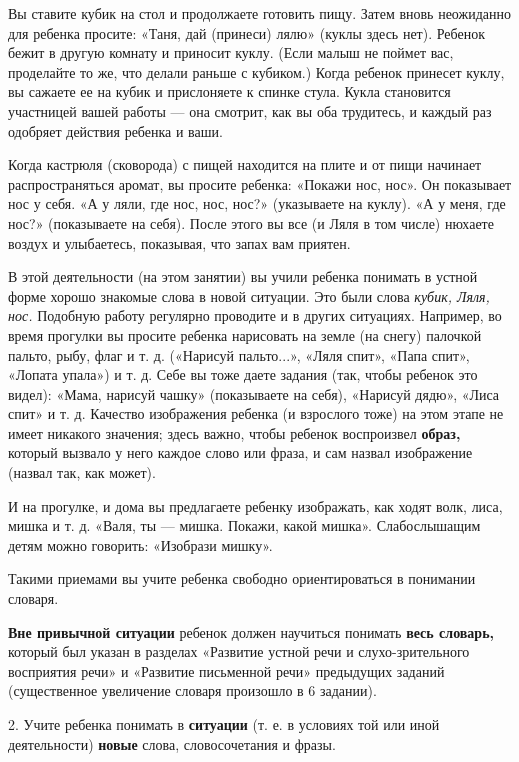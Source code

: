 \documentclass[a5paper]{book}
\renewcommand{\emph}[1]{\textit{#1}}
\begin{document}
Вы ставите кубик на стол и продолжаете готовить пищу. Затем вновь
неожиданно для ребенка просите: «Таня, дай (принеси) лялю» (куклы здесь
нет). Ребенок бежит в другую комнату и приносит куклу. (Если малыш не
поймет вас, проделайте то же, что делали раньше с кубиком.) Когда
ребенок принесет куклу, вы сажаете ее на кубик и прислоняете к спинке
стула. Кукла становится участницей вашей работы --- она смотрит, как вы
оба трудитесь, и каждый раз одобряет действия ребенка и ваши.

Когда кастрюля (сковорода) с пищей находится на плите и от пищи начинает
распространяться аромат, вы просите ребенка: «Покажи нос, нос». Он
показывает нос у себя. «А у ляли, где нос, нос, нос?» (указываете на
куклу). «А у меня, где нос?» (показываете на себя). После этого вы все
(и Ляля в том числе) нюхаете воздух и улыбаетесь, показывая, что запах
вам приятен.

В этой деятельности (на этом занятии) вы учили ребенка понимать в устной
форме хорошо знакомые слова в новой ситуации. Это были слова
\emph{кубик, Ляля, нос.} Подобную работу регулярно проводите и в других
ситуациях. Например, во время прогулки вы просите ребенка нарисовать на
земле (на снегу) палочкой пальто, рыбу, флаг и т. д. («Нарисуй
пальто...», «Ляля спит», «Папа спит», «Лопата упала») и т. д. Себе вы
тоже даете задания (так, чтобы ребенок это видел): «Мама, нарисуй чашку»
(показываете на себя), «Нарисуй дядю», «Лиса спит» и т. д. Качество
изображения ребенка (и взрослого тоже) на этом этапе не имеет никакого
значения; здесь важно, чтобы ребенок воспроизвел \textbf{образ,} который
вызвало у него каждое слово или фраза, и сам назвал изображение (назвал
так, как может).

И на прогулке, и дома вы предлагаете ребенку изображать, как ходят волк,
лиса, мишка и т. д. «Валя, ты --- мишка. Покажи, какой мишка».
Слабослышащим детям можно говорить: «Изобрази мишку».

Такими приемами вы учите ребенка свободно ориентироваться в понимании
словаря.

\textbf{Вне привычной ситуации} ребенок должен научиться понимать
\textbf{весь словарь,} который был указан в разделах «Развитие устной
речи и слухо-зрительного восприятия речи» и «Развитие письменной речи»
предыдущих заданий (существенное увеличение словаря произошло в 6
задании).

2. Учите ребенка понимать в \textbf{ситуации} (т. е. в условиях той или
иной деятельности) \textbf{новые} слова, словосочетания и фразы.
\end{document}
